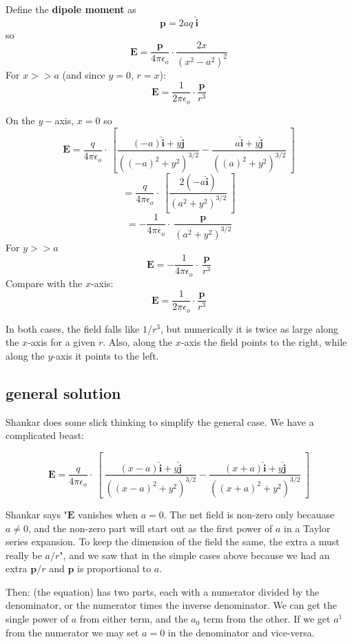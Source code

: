 \documentclass[11pt, oneside]{article}
\begin{document}
Define the \textbf{dipole moment} as
\[ \mathbf{p} = 2aq \ \hat{\mathbf{i}} \]
so
\[ \mathbf{E} = \frac{\mathbf{p}}{4 \pi \epsilon_o} \cdot \frac{2x}{(x^2 - a^2)^2}  \]
For $x >> a$ (and since $y=0$, $r = x$):
\[ \mathbf{E} = \frac{1}{2 \pi \epsilon_o} \cdot \frac{\mathbf{p}}{r^3}  \]

On the $y-$axis, $x = 0$ so 
\[ \mathbf{E} = \frac{q}{4 \pi \epsilon_o} \cdot \ [ \frac{(- a) \hat{\mathbf{i}} + y \hat{\mathbf{j}} }{((- a)^2 + y^2)^{3/2}} - \frac{a \hat{\mathbf{i}} + y \hat{\mathbf{j}} }{((a)^2 + y^2)^{3/2}} \ ] \]
\[ = \frac{q}{4 \pi \epsilon_o} \cdot \ [ \frac{2 (- a \hat{\mathbf{i}}) }{(a^2 + y^2)^{3/2}}  \ ] \]
\[ = - \frac{1}{4 \pi \epsilon_o} \cdot \ \frac{\mathbf{p}}{(a^2 + y^2)^{3/2}}   \]
For $y >> a$
\[ \mathbf{E} = - \frac{1}{4 \pi \epsilon_o} \cdot \ \frac{\mathbf{p}}{r^3}  \]
Compare with the $x$-axis:
\[ \mathbf{E} = \frac{1}{2 \pi \epsilon_o} \cdot \frac{\mathbf{p}}{r^3}  \]

In both cases, the field falls like $1/r^3$, but numerically it is twice as large along the $x$-axis for a given $r$.  Also, along the $x$-axis the field points to the right, while along the $y$-axis it points to the left.

\subsection*{general solution}
Shankar does some slick thinking to simplify the general case.  We have a complicated beast:

\[ \mathbf{E} = \frac{q}{4 \pi \epsilon_o} \cdot \ [ \ \frac{ (x - a) \hat{\mathbf{i}} + y \hat{\mathbf{j}} }{((x - a)^2 + y^2)^{3/2}} - \frac{(x + a) \hat{\mathbf{i}} + y \hat{\mathbf{j}}}{((x + a)^2 + y^2)^{3/2}} \ ] \]

Shankar says "$\mathbf{E}$ vanishes when $a = 0$.  The net field is non-zero only becauase $a \ne 0$, and the non-zero part will start out as the first power of $a$ in a Taylor series expansion.  To keep the dimension of the field the same, the extra a must really be $a/r$", and we saw that in the simple cases above because we had an extra $\mathbf{p}/r$ and $\mathbf{p}$ is proportional to $a$.

Then:  (the equation) has two parts, each with a numerator divided by the denominator, or the numerator times the inverse denominator. We can get the single power of $a$ from either term, and the $a_0$ term from the other.  If we get $a^1$ from the numerator we may set $a = 0$ in the denominator and vice-versa.
\end{document}
